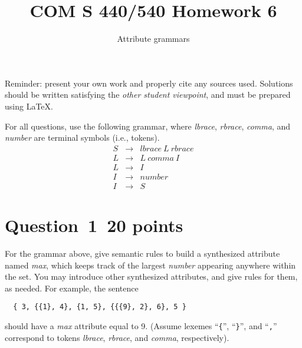\documentclass[10pt]{article}
\title{COM S 440/540 Homework 6}
\date{}
\author{Attribute grammars}
\begin{document}
\maketitle

\noindent
Reminder: present your own work and properly cite any sources used.
Solutions should be written satisfying the \emph{other student viewpoint},
and must be prepared using \LaTeX.
\renewcommand{\thepage}{~}
 
 
For all questions, use the following grammar, where
\emph{lbrace}, \emph{rbrace}, \emph{comma}, and \emph{number}
are terminal symbols (i.e., tokens).
\begin{eqnarray}
  S & \rightarrow & \mathit{lbrace} ~L~ \mathit{rbrace}
\\
  L & \rightarrow & L ~\mathit{comma}~ I
\\
  L & \rightarrow & I
\\
  I & \rightarrow & \mathit{number}
\\
  I & \rightarrow & S
\end{eqnarray}


\section*{Question~1~\hfill 20 points}

For the grammar above, give semantic rules to build
a synthesized attribute named \emph{max},
which keeps track of the largest \emph{number} appearing anywhere
within the set.
You may introduce other synthesized attributes,
and give rules for them,
as needed.
For example, the sentence
\begin{verbatim}
  { 3, {{1}, 4}, {1, 5}, {{{9}, 2}, 6}, 5 }
\end{verbatim}
should have a \emph{max} attribute equal to 9.
(Assume lexemes ``\verb|{|'', ``\verb|}|'', and ``\verb|,|''
correspond to tokens \emph{lbrace}, \emph{rbrace},
and \emph{comma}, respectively).
\begin{framed}

\end{framed}

\end{document}
